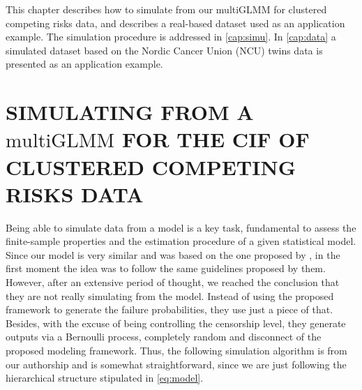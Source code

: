 This chapter describes how to simulate from our multiGLMM for clustered
competing risks data, and describes a real-based dataset used as an
application example. The simulation procedure is addressed in
\autoref{cap:simu}. In \autoref{cap:data} a simulated dataset based on
the Nordic Cancer Union (NCU) twins data is presented as an application
example.

\section{SIMULATING FROM A \(\text{multiGLMM}\) FOR THE CIF OF CLUSTERED
  COMPETING RISKS DATA}
\label{cap:simu}

Being able to simulate data from a model is a key task, fundamental to
assess the finite-sample properties and the estimation procedure of a
given statistical model. Since our model is very similar and was based
on the one proposed by , in the first moment the
idea was to follow the same guidelines proposed by them. However, after
an extensive period of thought, we reached the conclusion that they are
not really simulating from the model. Instead of using the proposed
framework to generate the failure probabilities, they use just a piece
of that. Besides, with the excuse of being controlling the censorship
level, they generate outputs via a Bernoulli process, completely random
and disconnect of the proposed modeling framework. Thus, the following
simulation algorithm is from our authorship and is somewhat
straightforward, since we are just following the hierarchical structure
stipulated in \autoref{eq:model}.

